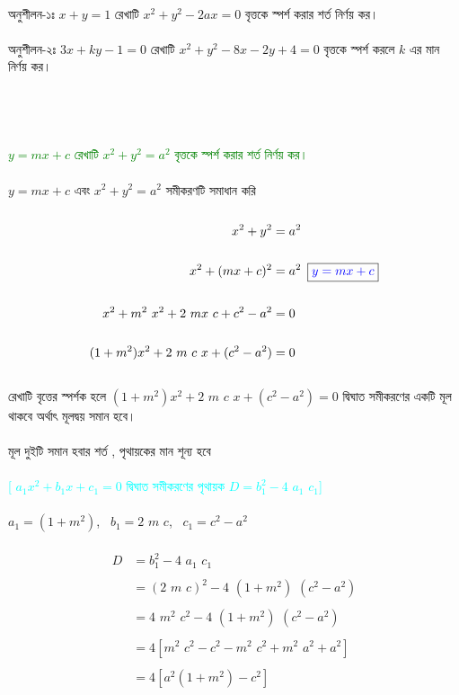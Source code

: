 \documentclass{article}
\begin{document}
	\\
	অনুশীলন-১ঃ  $x+y=1$ রেখাটি  $x^2+y^2-2ax=0$ বৃত্তকে স্পর্শ করার শর্ত নির্ণয় কর। \\
	\\
	অনুশীলন-২ঃ  $3x+ky-1=0$ রেখাটি  $x^2+y^2-8x-2y+4=0$ বৃত্তকে স্পর্শ করলে $k$ এর মান  নির্ণয় কর। \\
	\\
	\\
	\\
	\\ 
	\textcolor{green}{$y=mx+c$ রেখাটি  $x^2+y^2=a^2$ বৃত্তকে স্পর্শ করার শর্ত নির্ণয় কর।} \\
	\\
	$y=mx+c$ এবং   $x^2+y^2=a^2$ 	সমীকরণটি সমাধান করি\\ 
	\\ 
	\begin{align*}
		x^2+y^2&=a^2\\
		\\
		x^2+(mx+c)^2&=a^2\,\,\,\boxed{\textcolor{blue}{y=mx+c}}\\
		\\
		x^2+m^2\,\,x^2+2\,\,mx\,\,c+c^2-a^2&=0\\
		\\
		(1+m^2)x^2+2\,\,m\,\,c\,\,x+(c^2-a^2)&=0
	\end{align*}
	\\ 
	রেখাটি বৃত্তের স্পর্শক হলে $	(1+m^2)x^2+2\,\,m\,\,c\,\,x+(c^2-a^2)=0$ দ্বিঘাত সমীকরণের একটি মূল থাকবে অর্থাৎ মূলদ্বয় সমান হবে। \\
	\\
	মূল দুইটি সমান হবার শর্ত , পৃথায়কের মান  শূন্য হবে \\
	\\
	\textcolor{cyan}{[ $a_1x^2+b_1x+c_1=0$ দ্বিঘাত সমীকরণের পৃথায়ক $D=b_1^2-4\,\,a_1\,\,c_1$]}\\
	\\ 
	$a_1=(1+m^2)$,\,\,\, $b_1=2\,\,m\,\,c$,\,\,\, $c_1=c^2-a^2$\\
	\\
	\begin{align*}
		D&=b_1^2-4\,\,a_1\,\,c_1\\
		\\
		&=(2\,\,m\,\,c)^2-4\,\,(1+m^2)\,\,(c^2-a^2)\\
		\\
		&=4\,\,m^2\,\,c^2-4\,\,(1+m^2)\,\,(c^2-a^2)\\
		\\
		&=4[m^2\,\,c^2-c^2-m^2\,\,c^2+m^2\,\,a^2+a^2]\\
		\\
		&=4[a^2(1+m^2)-c^2]
	\end{align*}
\end{document}

